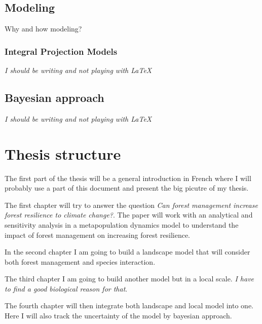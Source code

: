 \documentclass[a4paper,12pt,twoside]{article}
\begin{document}
\subsection*{Modeling}

Why and how modeling?

\subsubsection*{Integral Projection Models}

\textit{I should be writing and not playing with \LaTeX}

\subsection*{Bayesian approach}

\textit{I should be writing and not playing with \LaTeX}

\section{Thesis structure}

The first part of the thesis will be a general introduction in French where  I will probably use a part of this document and present the big picutre of my thesis.

The first chapter will try to answer the question \textit{Can forest management increase forest resilience to climate change?}. The paper will work with an analytical and sensitivity analysis in a metapopulation dynamics model to understand the impact of forest management on increasing forest resilience.

In the second chapter I am going to build a landscape model that will consider both forest management and species interaction.

The third chapter I am going to build another model but in a local scale. \textit{I have to find a good biological reason for that}.

The fourth chapter will then integrate both landscape and local model into one. Here I will also track the uncertainty of the model by bayesian approach.



\end{document}
